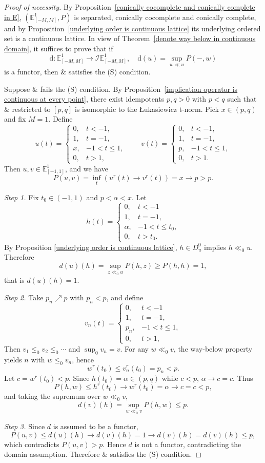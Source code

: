 \documentclass[preprint,3p,times]{elsarticle}
\theoremstyle{plain}
\theoremstyle{definition}
\numberwithin{equation}{section}
\begin{document}
\begin{proof}[Proof of necessity]
By Proposition~\ref{conically cocomplete and conically complete in E}, 
$(\mathbb{E}^{1}_{[-M,M]},P)$ is separated, conically cocomplete and conically complete, 
and by Proposition~\ref{underlying order is continuous lattice} its underlying 
ordered set is a continuous lattice.  In view of Theorem~\ref{denote way below in continuous domain}, 
it suffices to prove that if
\[
\mathrm{d}: \mathbb{E}^{1}_{[-M,M]} \to \mathcal{I} \mathbb{E}^{1}_{[-M,M]},\quad
\mathrm{d}(u)=\sup_{w\ll u} P(-,w)
\]
is a functor, then $\&$ satisfies the (S) condition.

Suppose $\&$ fails the (S) condition. By Proposition~\ref{implication operator is continuous at every point}, 
there exist idempotents $p,q>0$ with $p<q$ such that $\&$ restricted to $[p,q]$ is isomorphic 
to the {\L}ukasiewicz t-norm.  Pick $x\in(p,q)$ and fix $M=1$. Define
\[
u(t)=\begin{cases}0,&t<-1,\\1,&t=-1,\\x,&-1<t\le1,\\0,&t>1,\end{cases}
\qquad
v(t)=\begin{cases}0,&t<-1,\\1,&t=-1,\\p,&-1<t\le1,\\0,&t>1.\end{cases}
\]
Then $u,v\in\mathbb E^1_{[-1,1]}$, and we have
\[
P(u,v)=\inf_t(u^r(t)\to v^r(t))=x\to p>p. \tag{$\ast$}
\]

\emph{Step 1.} Fix $t_0\in(-1,1)$ and $p<\alpha<x$. Let
\[
h(t)=\begin{cases}0,&t<-1\\1,&t=-1,\\\alpha,&-1<t\le t_0,\\0,&t>t_0.\end{cases}
\]  
By  Proposition
\ref{underlying order is continuous lattice},  \(h\in D_u^0\) implies \(h\ll_0u\).
Therefore
\[
d(u)(h)=\sup_{z\ll_0 u}P(h,z)\ge P(h,h)=1,
\]
that is $d(u)(h)=1$.

\emph{Step 2.} Take $p_n\nearrow p$ with $p_n<p$, and define
\[
v_n(t)=\begin{cases}0,&t<-1 \\1,&t=-1,\\p_n,&-1<t\le1,\\0,&t>1,\end{cases}
\]
Then $v_1\le_0 v_2\le_0\cdots$ and $\sup_0 v_n=v$. For any $w\ll_0 v$, the way-below
property yields $n$ with $w\le_0 v_n$, hence
\[
w^r(t_0)\le v^r_n(t_0)=p_n<p.
\]
Let $c=w^r(t_0)<p$. Since $h(t_0)=\alpha\in(p,q)$ while $c<p$, 
$\alpha\to c=c$. Thus
\[
P(h,w)\le h^r(t_0)\to w^r(t_0)=\alpha\to c=c<p,
\]
and taking the supremum over $w\ll_0 v$,
\[
d(v)(h)=\sup_{w\ll_0 v}P(h,w)\le p.
\]

\emph{Step 3.} Since \(d\) is assumed to be a functor, 
\[
P(u,v)\le d(u)(h)\to d(v)(h)=1\to d(v)(h)=d(v)(h)\le p,
\]
which contradicts $P(u,v)>p$. Hence $d$ is not a functor,
contradicting the domain assumption. Therefore $\&$ satisfies the (S) condition.
\end{proof}
\end{document}
